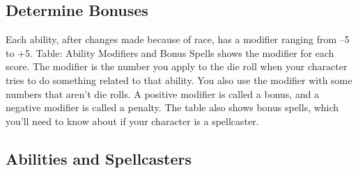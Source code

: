 \subsection{Determine Bonuses}

				
Each ability, after changes made because of race, has a modifier ranging from --5 to +5. Table: Ability Modifiers and Bonus Spells shows the modifier for each score. The modifier is the number you apply to the die roll when your character tries to do something related to that ability. You also use the modifier with some numbers that aren't die rolls. A positive modifier is called a bonus, and a negative modifier is called a penalty. The table also shows bonus spells, which you'll need to know about if your character is a spellcaster.
				
\subsection{Abilities and Spellcasters}

